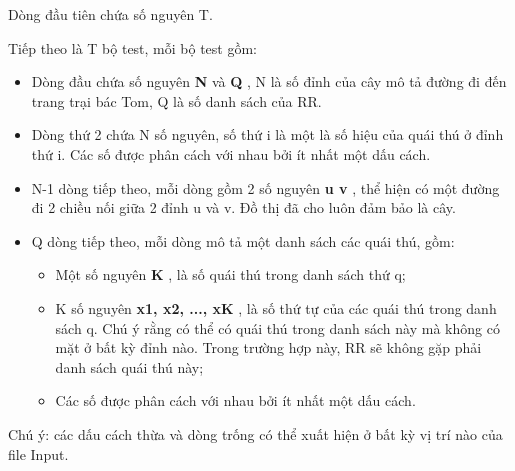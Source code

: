 Dòng đầu tiên chứa số nguyên T.

Tiếp theo là T bộ test, mỗi bộ test gồm:
\begin{itemize}
	\item Dòng đầu chứa số nguyên \textbf{ N } và \textbf{ Q } , N là số đỉnh của cây mô tả đường đi đến trang trại bác Tom, Q là số danh sách của RR.
	\item Dòng thứ 2 chứa N số nguyên, số thứ i là một là số hiệu của quái thú ở đỉnh thứ i. Các số được phân cách với nhau bởi ít nhất một dấu cách.
	\item N-1 dòng tiếp theo, mỗi dòng gồm 2 số nguyên \textbf{ u v } , thể hiện có một đường đi 2 chiều nối giữa 2 đỉnh u và v. Đồ thị đã cho luôn đảm bảo là cây.
	\item Q dòng tiếp theo, mỗi dòng mô tả một danh sách các quái thú, gồm:
\begin{itemize}
	\item Một số nguyên \textbf{ K } , là số quái thú trong danh sách thứ q;
	\item K số nguyên \textbf{ x1, x2, ..., xK } , là số thứ tự của các quái thú trong danh sách q. Chú ý rằng có thể có quái thú trong danh sách này mà không có mặt ở bất kỳ đỉnh nào. Trong trường hợp này, RR sẽ không gặp phải danh sách quái thú này;
\end{itemize}
\begin{itemize}
	\item Các số được phân cách với nhau bởi ít nhất một dấu cách.
\end{itemize}
\end{itemize}

Chú ý: các dấu cách thừa và dòng trống có thể xuất hiện ở bất kỳ vị trí nào của file Input.